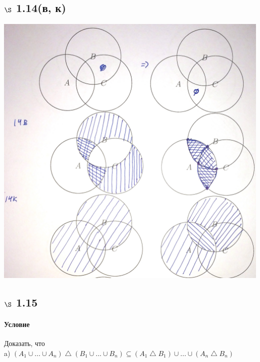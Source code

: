 \documentclass[a4paper,12pt]{article}
\begin{document}
\subsection*{$\S$ 1.14(в, к)}
\begin{center}
  \includegraphics[scale=0.15]{img/3.jpg}
\end{center}
\subsection*{$\S$ 1.15}
\paragraph*{Условие}
Доказать, что\\
a) $(A_1 \cup ... \cup A_n) \bigtriangleup (B_1 \cup ... \cup B_n) \subseteq (A_1 \bigtriangleup B_1) \cup ... \cup (A_n \bigtriangleup B_n) $
\end{document}
